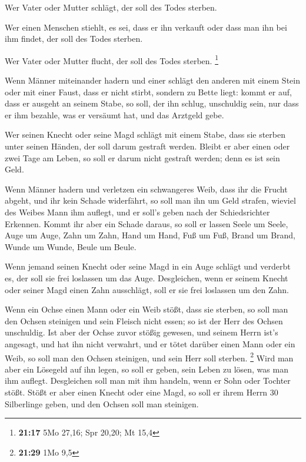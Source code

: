  Wer Vater oder Mutter schlägt, der soll des Todes
sterben.

 Wer einen Menschen stiehlt, es sei, dass er ihn verkauft
oder dass man ihn bei ihm findet, der soll des Todes sterben.

 Wer Vater oder Mutter flucht, der soll des Todes
sterben. \footnote{\textbf{21:17} 5Mo 27,16; Spr 20,20; Mt 15,4}

 Wenn Männer miteinander hadern und einer schlägt den
anderen mit einem Stein oder mit einer Faust, dass er nicht stirbt,
sondern zu Bette liegt:  kommt er auf, dass er ausgeht an
seinem Stabe, so soll, der ihn schlug, unschuldig sein, nur dass er ihm
bezahle, was er versäumt hat, und das Arztgeld gebe.

 Wer seinen Knecht oder seine Magd schlägt mit einem
Stabe, dass sie sterben unter seinen Händen, der soll darum gestraft
werden.  Bleibt er aber einen oder zwei Tage am Leben, so
soll er darum nicht gestraft werden; denn es ist sein Geld.

 Wenn Männer hadern und verletzen ein schwangeres Weib,
dass ihr die Frucht abgeht, und ihr kein Schade widerfährt, so soll man
ihn um Geld strafen, wieviel des Weibes Mann ihm auflegt, und er soll's
geben nach der Schiedsrichter Erkennen.  Kommt ihr aber
ein Schade daraus, so soll er lassen Seele um Seele, 
Auge um Auge, Zahn um Zahn, Hand um Hand, Fuß um Fuß, 
Brand um Brand, Wunde um Wunde, Beule um Beule.

 Wenn jemand seinen Knecht oder seine Magd in ein Auge
schlägt und verderbt es, der soll sie frei loslassen um das Auge.
 Desgleichen, wenn er seinem Knecht oder seiner Magd
einen Zahn ausschlägt, soll er sie frei loslassen um den Zahn.

 Wenn ein Ochse einen Mann oder ein Weib stößt, dass sie
sterben, so soll man den Ochsen steinigen und sein Fleisch nicht essen;
so ist der Herr des Ochsen unschuldig.  Ist aber der
Ochse zuvor stößig gewesen, und seinem Herrn ist's angesagt, und hat ihn
nicht verwahrt, und er tötet darüber einen Mann oder ein Weib, so soll
man den Ochsen steinigen, und sein Herr soll sterben. \footnote{\textbf{21:29}
  1Mo 9,5}  Wird man aber ein Lösegeld auf ihn legen, so
soll er geben, sein Leben zu lösen, was man ihm auflegt. 
Desgleichen soll man mit ihm handeln, wenn er Sohn oder Tochter stößt.
 Stößt er aber einen Knecht oder eine Magd, so soll er
ihrem Herrn 30 Silberlinge geben, und den Ochsen soll man steinigen.

